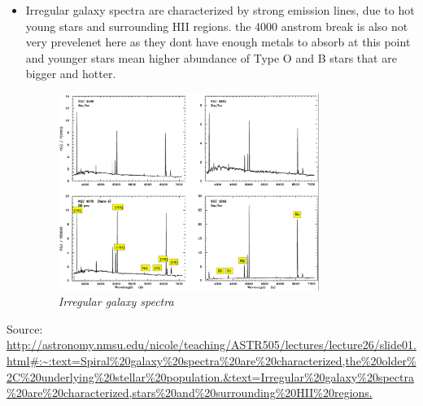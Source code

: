 \documentclass[11pt]{article}
\numberwithin{equation}{section}
\begin{document}
\begin{itemize}
\item Irregular galaxy spectra are characterized by strong emission lines, due to hot young stars and surrounding HII regions.  the 4000 anstrom break is also not very prevelenet here as they dont have enough metals to absorb at this point and younger stars mean higher abundance of Type O and B stars that are bigger and hotter. 

\begin{figure}[H]
\centering
\includegraphics[width=0.8\textwidth]{Graph8.png}
\caption{\label{fig:2}\emph{Irregular galaxy spectra}}
\end{figure}
\end{itemize}


Source: \url{http://astronomy.nmsu.edu/nicole/teaching/ASTR505/lectures/lecture26/slide01.html#:~:text=Spiral%20galaxy%20spectra%20are%20characterized,the%20older%2C%20underlying%20stellar%20population.&text=Irregular%20galaxy%20spectra%20are%20characterized,stars%20and%20surrounding%20HII%20regions.}
\end{document}
